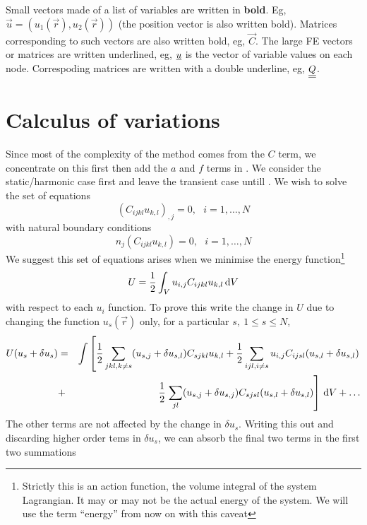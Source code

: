 \documentclass[a4paper]{article}
\begin{document}
Small vectors made of a list of variables are written in
\textbf{bold}. Eg, $\vec u=(u_1(\vec r),u_2(\vec r))$ (the position
vector is also written bold). Matrices corresponding to such vectors
are also written bold, eg, $\vec C$. The large FE vectors or matrices
are written underlined, eg, ${\underline{u}}$ is the vector of variable
values on each node. Correspoding matrices are written with a double
underline, eg, $\underline{\underline{Q}}$.

\section{Calculus of variations}
\label{theory}

Since most of the complexity of the method comes from the $C$ term, we
concentrate on this first then add the $a$ and $f$ terms in
. We consider the static/harmonic case first and leave
the transient case untill . We wish to solve the set of
equations
\begin{equation}
  (C_{ijkl}u_{k,l})_{,j}=0,~~~i=1,\ldots,N
\end{equation}
with natural boundary conditions
\begin{equation}
  n_j(C_{ijkl}u_{k,l})=0,~~~i=1,\ldots,N
\label{BC}
\end{equation}
We suggest this set of equations arises when we minimise the energy
function\footnote{Strictly this is an action function, the volume
integral of the system Lagrangian. It may or may not be the actual
energy of the system. We will use the term ``energy'' from now on with this caveat}
\begin{equation}
  U=\frac12 \int_V u_{i,j} C_{ijkl} u_{k,l}\, \mathrm{d} V
  \label{energy}
\end{equation}
with respect to each $u_i$ function. To prove this write the change in
$U$ due to changing the function $u_s(\vec r)$ only, for a particular $s,~1\le s\le N$,
\begin{eqnarray*}
  U(u_s+\delta u_s)&=&\int\left[ \frac12 \sum_{jkl,k\ne s} (u_{s,j}+\delta u_{s,l}) C_{sjkl} u_{k,l}
+\frac12\sum_{ijl,i\ne s} u_{i,j} C_{ijsl} (u_{s,l}+\delta u_{s,l})\right.\\
&+&\frac12\left.\sum_{jl} (u_{s,j}+\delta u_{s,j})C_{sjsl}(u_{s,l}+\delta u_{s,l})\right]\,\mathrm{d} V+\ldots
\end{eqnarray*}
The other terms are not affected by the change in $\delta
u_s$. Writing this out and discarding higher order tems in $\delta
u_s$, we can absorb the final two terms in the first two summations
\end{document}
